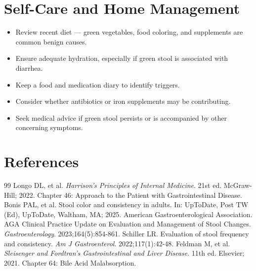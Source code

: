 \section*{Self-Care and Home Management}
\begin{itemize}
  \item Review recent diet — green vegetables, food coloring, and supplements are common benign causes.
  \item Ensure adequate hydration, especially if green stool is associated with diarrhea.
  \item Keep a food and medication diary to identify triggers.
  \item Consider whether antibiotics or iron supplements may be contributing.
  \item Seek medical advice if green stool persists or is accompanied by other concerning symptoms.
\end{itemize}

\section*{References}

\begin{thebibliography}{99}
 Longo DL, et al. \emph{Harrison's Principles of Internal Medicine}. 21st ed. McGraw-Hill; 2022. Chapter 46: Approach to the Patient with Gastrointestinal Disease.
 Bonis PAL, et al. Stool color and consistency in adults. In: UpToDate, Post TW (Ed), UpToDate, Waltham, MA; 2025.
 American Gastroenterological Association. AGA Clinical Practice Update on Evaluation and Management of Stool Changes. \emph{Gastroenterology}. 2023;164(5):854-861.
 Schiller LR. Evaluation of stool frequency and consistency. \emph{Am J Gastroenterol}. 2022;117(1):42-48.
 Feldman M, et al. \emph{Sleisenger and Fordtran's Gastrointestinal and Liver Disease}. 11th ed. Elsevier; 2021. Chapter 64: Bile Acid Malabsorption.
\end{thebibliography}
